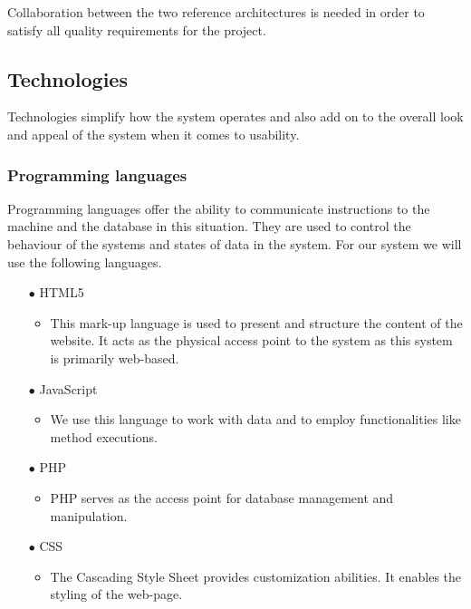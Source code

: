 \documentclass[a4paper,12pt]{article}
\begin{document}
Collaboration between the two reference architectures is needed in order to satisfy all quality requirements for the project.

\newpage
\subsection{Technologies}
\begin{flushleft}
	Technologies simplify how the system operates and also add on to the overall look and appeal of the system when it comes to usability.
	
	\subsubsection{Programming languages}
	Programming languages offer the ability to communicate instructions to the machine and the database in this situation. They are used to control the behaviour of the systems and states of data in the system. For our system we will use the following languages.
	
	\begin{itemize}
		\item[$\bullet$] HTML5
		\begin{itemize}
		\item This mark-up language is used to present and structure the content of the website. It acts as the physical access point to the system as this system is primarily web-based.
		\end{itemize}
		
		\item[$\bullet$] JavaScript
		\begin{itemize}
		\item We use this language to work with data and to employ functionalities like method executions.
		\end{itemize}
		
		\item[$\bullet$] PHP
		\begin{itemize}
		\item PHP serves as the access point for database management and manipulation.
		\end{itemize}
		
		\item[$\bullet$] CSS
		\begin{itemize}
		\item The Cascading Style Sheet provides customization abilities. It enables the styling of the web-page.
		\end{itemize}
		

\end{itemize}
\end{flushleft}
\end{document}
